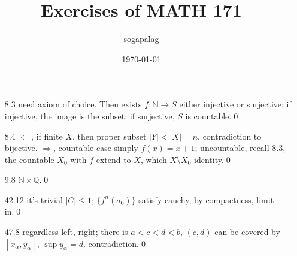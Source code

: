 \documentclass[paper=a4, fontsize=11pt]{scrartcl} %
\title{Exercises of MATH 171}
\author{sogapalag}
\date{\normalsize\today}
\numberwithin{equation}{section} %
\numberwithin{figure}{section} %
\numberwithin{table}{section} %
\begin{document}
\maketitle
\begin{itemize}
	\item[8.3] need axiom of choice. Then exists $f:\mathbb{N}\rightarrow S$ either injective or surjective; if injective, the image is the subset; if surjective, $S$ is countable.\qed
	\item[8.4] $\Leftarrow$, if finite $X$, then proper subset $|Y|<|X|=n$, contradiction to bijective. $\Rightarrow$, countable case simply $f(x)=x+1$; uncountable, recall 8.3, the countable $X_0$ with $f$ extend to $X$, which $X\setminus X_0$ identity.\qed
	\item[9.8] $\mathbb{N}\times \mathbb{Q}$.\qed
	\item[42.12] it's trivial $|C|\leq 1$; $\{f^n(a_0)\}$ satisfy cauchy, by compactness, limit in.\qed
	\item[47.8] regardless left, right; there is $a<c<d<b$, $(c,d)$ can be covered by $[x_\alpha,y_\alpha]$, $\sup y_\alpha=d$. contradiction.\qed
\end{itemize}
\end{document}

